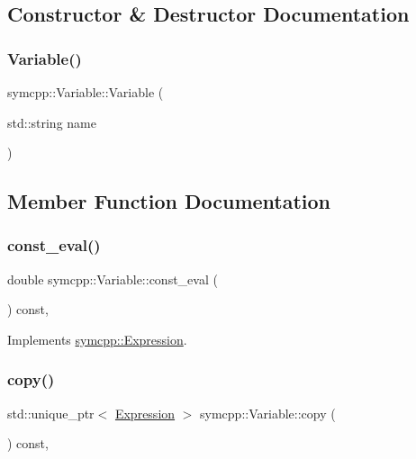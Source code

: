 \subsection{Constructor \& Destructor Documentation}
\mbox{\label{classsymcpp_1_1Variable_abe52e6589e8189c46011530bed23f5cc}} 
\subsubsection{\texorpdfstring{Variable()}{Variable()}}
{\footnotesize\ttfamily symcpp\+::\+Variable\+::\+Variable (\begin{DoxyParamCaption}\item[{std\+::string}]{name }\end{DoxyParamCaption})}



\subsection{Member Function Documentation}
\mbox{\label{classsymcpp_1_1Variable_a822c9e3e85da6e89949a9f2df7244f5c}} 
\subsubsection{\texorpdfstring{const\_eval()}{const\_eval()}}
{\footnotesize\ttfamily double symcpp\+::\+Variable\+::const\+\_\+eval (\begin{DoxyParamCaption}{ }\end{DoxyParamCaption}) const\hspace{0.3cm}{\ttfamily [override]}, {\ttfamily [virtual]}}



Implements \mbox{\hyperlink{classsymcpp_1_1Expression_a81c8069347f586cb5632338d97c278ad}{symcpp\+::\+Expression}}.

\mbox{\label{classsymcpp_1_1Variable_a5a434805a53a7c46e3659a8efdc7ba80}} 
\subsubsection{\texorpdfstring{copy()}{copy()}}
{\footnotesize\ttfamily std\+::unique\+\_\+ptr$<$ \mbox{\hyperlink{classsymcpp_1_1Expression}{Expression}} $>$ symcpp\+::\+Variable\+::copy (\begin{DoxyParamCaption}{ }\end{DoxyParamCaption}) const\hspace{0.3cm}{\ttfamily [override]}, {\ttfamily [virtual]}}



